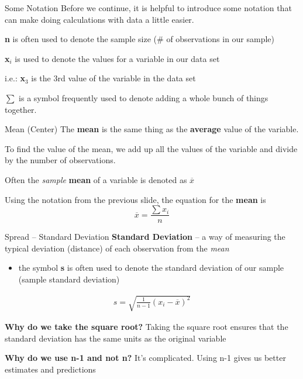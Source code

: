 \documentclass{beamer}
\begin{document}
\begin{frame}{Some Notation}
Before we continue, it is helpful to introduce some notation that can make doing calculations with data a little easier. \vspace{4mm}

\textbf{n} is often used to denote the sample size ($\#$ of observations in our sample) \vspace{4mm}

\textbf{x$_i$} is used to denote the values for a variable in our data set

i.e.: \textbf{x}$_3$ is the 3rd value of the variable in the data set \vspace{4mm}

$\sum$ is a symbol frequently used to denote adding a whole bunch of things together.
\end{frame}



\begin{frame}{Mean (Center)}
The \textbf{mean} is the same thing as the \textbf{average} value of the variable.\vspace{4mm}

To find the value of the mean, we add up all the values of the variable and divide by the number of observations.\vspace{4mm}

Often the \textit{sample} \textbf{mean} of a variable is denoted as \textbf{$\overline{x}$}\vspace{4mm}

Using the notation from the previous slide, the equation for the \textbf{mean} is
\begin{equation*}
\overline{x} = \frac{\sum x_i}{n}
\end{equation*}
\end{frame}



\begin{frame}{Spread -- Standard Deviation}
\textbf{Standard Deviation} -- a way of measuring the typical deviation (distance) of each observation from the \textit{mean}
\begin{itemize}
    \item the symbol \textbf{s} is often used to denote the standard deviation of our sample (sample standard deviation)
\end{itemize}
\begin{align*}
s = \sqrt{\frac{1}{n-1} (x_i - \overline{x})^2 }
\end{align*}

\textbf{Why do we take the square root?}
Taking the square root ensures that the standard deviation has the same units as the original variable\vspace{4mm}

\textbf{Why do we use n-1 and not n?}
It's complicated. Using n-1 gives us better estimates and predictions
\end{frame}
\end{document}
